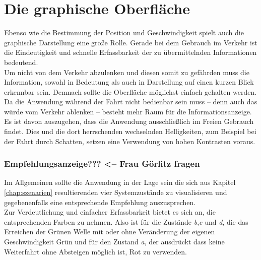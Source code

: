 \section{Die graphische Oberfläche}
Ebenso wie die Bestimmung der Position und Geschwindigkeit spielt auch die graphische Darstellung eine große Rolle. Gerade bei dem Gebrauch im Verkehr ist die Eindeutigkeit und schnelle Erfassbarkeit der zu übermittelnden Informationen bedeutend.  \\
Um nicht von dem Verkehr abzulenken und diesen somit zu gefährden muss die Information, sowohl in Bedeutung als auch in Darstellung auf einen kurzen Blick erkennbar sein. Demnach sollte die Oberfläche möglichst einfach gehalten werden.\\
Da die Anwendung während der Fahrt nicht bedienbar sein muss -- denn auch das würde vom Verkehr ablenken -- besteht mehr Raum für die Informationsanzeige. 
Es ist davon auszugehen, dass die Anwendung ausschließlich im Freien Gebrauch findet. Dies und die dort herrschenden wechselnden Helligkeiten, zum Beispiel bei der Fahrt durch Schatten, setzen eine Verwendung von hohen Kontrasten voraus.
\subsubsection{Empfehlungsanzeige??? <-- Frau Görlitz fragen}
Im Allgemeinen sollte die Anwendung in der Lage sein die sich aus Kapitel \ref{chap:szenarien} resultierenden vier Systemzustände zu visualisieren und gegebenenfalls eine entsprechende Empfehlung auszusprechen.\\
Zur Verdeutlichung und einfacher Erfassbarkeit bietet es sich an, die entsprechenden Farben zu nehmen. Also ist für die Zustände \textit{b},\textit{c} und \textit{d}, die das Erreichen der Grünen Welle mit oder ohne Veränderung der eigenen Geschwindigkeit Grün und für den Zustand \textit{a}, der ausdrückt dass keine Weiterfahrt ohne Absteigen möglich ist, Rot zu verwenden.